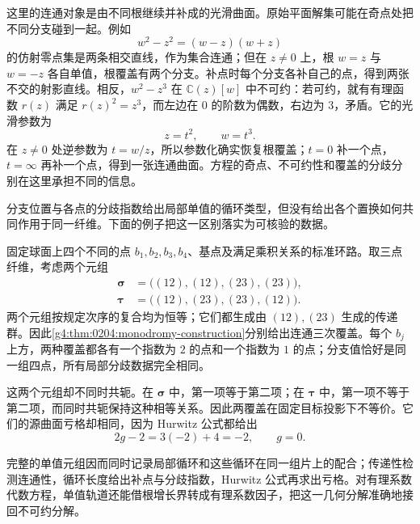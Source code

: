 这里的连通对象是由不同根继续并补成的光滑曲面。原始平面解集可能在奇点处把不同分支碰到一起。例如
\[
	w^2-z^2=(w-z)(w+z)
\]
的仿射零点集是两条相交直线，作为集合连通；但在 \(z\ne0\) 上，根 \(w=z\) 与 \(w=-z\) 各自单值，根覆盖有两个分支。补点时每个分支各补自己的点，得到两张不交的射影直线。相反，\(w^2-z^3\) 在 \(\mathbb C(z)[w]\) 中不可约：若可约，就有有理函数 \(r(z)\) 满足 \(r(z)^2=z^3\)，而左边在 \(0\) 的阶数为偶数，右边为 \(3\)，矛盾。它的光滑参数为
\[
	z=t^2,\qquad w=t^3.
\]
在 \(z\ne0\) 处逆参数为 \(t=w/z\)，所以参数化确实恢复根覆盖；\(t=0\) 补一个点，\(t=\infty\) 再补一个点，得到一张连通曲面。方程的奇点、不可约性和覆盖的分歧分别在这里承担不同的信息。

\ProseParagraphBreak

分支位置与各点的分歧指数给出局部单值的循环类型，但没有给出各个置换如何共同作用于同一纤维。下面的例子把这一区别落实为可核验的数据。

\begin{example}\label{g4:exm:0204:same-branch-profile}
	固定球面上四个不同的点 \(b_1,b_2,b_3,b_4\)、基点及满足乘积关系的标准环路。取三点纤维，考虑两个元组
	\[
		\begin{aligned}
			\boldsymbol\sigma&=\bigl((12),(12),(23),(23)\bigr),\\
			\boldsymbol\tau&=\bigl((12),(23),(23),(12)\bigr).
		\end{aligned}
	\]
	两个元组按规定次序的复合均为恒等；它们都生成由 \((12),(23)\) 生成的传递群。因此\cref{g4:thm:0204:monodromy-construction}分别给出连通三次覆盖。每个 \(b_j\) 上方，两种覆盖都各有一个指数为 \(2\) 的点和一个指数为 \(1\) 的点；分支值恰好是同一组四点，所有局部分歧数据完全相同。

	这两个元组却不同时共轭。在 \(\boldsymbol\sigma\) 中，第一项等于第二项；在 \(\boldsymbol\tau\) 中，第一项不等于第二项，而同时共轭保持这种相等关系。因此两覆盖在固定目标投影下不等价。它们的源曲面亏格却相同，因为 Hurwitz 公式都给出
	\[
		2g-2=3(-2)+4=-2,\qquad g=0.
	\]
\end{example}

完整的单值元组因而同时记录局部循环和这些循环在同一组片上的配合；传递性检测连通性，循环长度给出补点与分歧指数，Hurwitz 公式再求出亏格。对有理系数代数方程，单值轨道还能借根增长界转成有理系数因子，把这一几何分解准确地接回不可约分解。
